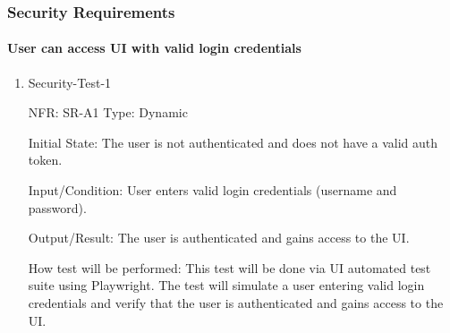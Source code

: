\documentclass[12pt, titlepage]{article}
\begin{document}
\subsubsection{Security Requirements}

\paragraph{User can access UI with valid login credentials}
\begin{enumerate}
  \item{Security-Test-1\\}

  NFR: SR-A1
  Type: Dynamic
            
  Initial State: The user is not authenticated and does not have a valid auth token.
            
  Input/Condition: User enters valid login credentials (username and password).
            
  Output/Result: The user is authenticated and gains access to the UI.
            
  How test will be performed: 
  This test will be done via UI automated test suite using Playwright. The test will simulate a user entering valid login 
  credentials and verify that the user is authenticated and gains access to the UI.
\end{enumerate}
\end{document}
